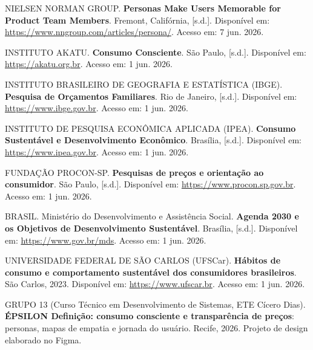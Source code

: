 \documentclass[12pt, a4paper]{article}
\begin{document}
 NIELSEN NORMAN GROUP. \textbf{Personas Make Users Memorable for Product Team Members}. Fremont, Califórnia, [s.d.]. Disponível em: \url{https://www.nngroup.com/articles/persona/}. Acesso em: 7 jun. 2026.

 INSTITUTO AKATU. \textbf{Consumo Consciente}. São Paulo, [s.d.]. Disponível em: \url{https://akatu.org.br}. Acesso em: 1 jun. 2026.

 INSTITUTO BRASILEIRO DE GEOGRAFIA E ESTATÍSTICA (IBGE). \textbf{Pesquisa de Orçamentos Familiares}. Rio de Janeiro, [s.d.]. Disponível em: \url{https://www.ibge.gov.br}. Acesso em: 1 jun. 2026.

 INSTITUTO DE PESQUISA ECONÔMICA APLICADA (IPEA). \textbf{Consumo Sustentável e Desenvolvimento Econômico}. Brasília, [s.d.]. Disponível em: \url{https://www.ipea.gov.br}. Acesso em: 1 jun. 2026.

 FUNDAÇÃO PROCON-SP. \textbf{Pesquisas de preços e orientação ao consumidor}. São Paulo, [s.d.]. Disponível em: \url{https://www.procon.sp.gov.br}. Acesso em: 1 jun. 2026.

 BRASIL. Ministério do Desenvolvimento e Assistência Social. \textbf{Agenda 2030 e os Objetivos de Desenvolvimento Sustentável}. Brasília, [s.d.]. Disponível em: \url{https://www.gov.br/mds}. Acesso em: 1 jun. 2026.

 UNIVERSIDADE FEDERAL DE SÃO CARLOS (UFSCar). \textbf{Hábitos de consumo e comportamento sustentável dos consumidores brasileiros}. São Carlos, 2023. Disponível em: \url{https://www.ufscar.br}. Acesso em: 1 jun. 2026.

\vspace{6pt}
\vspace{2pt}

 GRUPO 13 (Curso Técnico em Desenvolvimento de Sistemas, ETE Cícero Dias). \textbf{ÉPSILON \textemdash{} Definição: consumo consciente e transparência de preços}: personas, mapas de empatia e jornada do usuário. Recife, 2026. Projeto de design elaborado no Figma.
\end{document}
